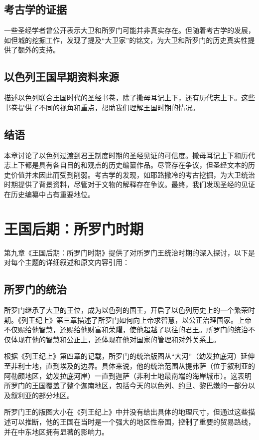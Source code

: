 \documentclass[12pt, a4paper]{ctexart}
\begin{document}
\subsection{考古学的证据}
一些圣经学者曾公开表示大卫和所罗门可能并非真实存在。但随着考古学的发展，如但城的挖掘工作，发现了提及“大卫家”的铭文，为大卫和所罗门的历史真实性提供了额外的支持。

\subsection{以色列王国早期资料来源}
描述以色列联合王国时代的圣经书卷，除了撒母耳记上下，还有历代志上下。这些书卷提供了不同的视角和重点，帮助我们理解王国时期的情况。

\subsection{结语}
本章讨论了以色列过渡到君王制度时期的圣经见证的可信度。撒母耳记上下和历代志上下都是具有各自目的和观点的历史编纂作品。尽管存在争议，但圣经文本的历史价值并未因此而受到削弱。考古学的发现，如耶路撒冷的考古挖掘，为大卫统治时期提供了背景资料，尽管对于文物的解释存在争议。最终，我们发现圣经的见证在历史编纂中占有重要地位。

\section{王国后期：所罗门时期}

第九章《王国后期：所罗门时期》提供了对所罗门王统治时期的深入探讨，以下是对每个主题的详细叙述和原文内容引用：

\subsection{所罗门的统治}
所罗门继承了大卫的王位，成为以色列的国王，开启了以色列历史上的一个繁荣时期。《列王纪上》第三章描述了所罗门如何向上帝求智慧，以公正治理国家。上帝不仅赐给他智慧，还赐给他财富和荣耀，使他超越了以往的君王。所罗门的统治不仅体现在他的智慧和公正上，还体现在他对国家的管理和对外关系上。

根据《列王纪上》第四章的记载，所罗门的统治版图从“大河”（幼发拉底河）延伸至非利士地，直到埃及的边界。具体来说，他的统治范围从提弗萨（位于叙利亚的阿勒颇地区，幼发拉底河岸）一直到迦萨（非利士地最南端的海岸城市）。这表明所罗门的王国覆盖了整个迦南地区，包括今天的以色列、约旦、黎巴嫩的一部分以及叙利亚的部分地区。

所罗门王的版图大小在《列王纪上》中并没有给出具体的地理尺寸，但通过这些描述可以推断，他的王国在当时是一个强大的地区性帝国，控制了重要的贸易路线，并在中东地区拥有显著的影响力。
\end{document}
